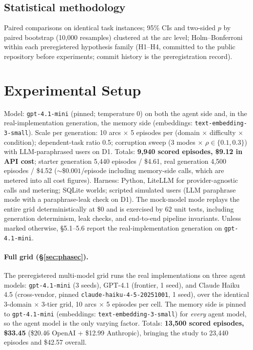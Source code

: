 \documentclass[11pt]{article}
\begin{document}
\subsection{Statistical methodology}

Paired comparisons on identical task instances; 95\% CIs and two-sided $p$ by
paired bootstrap (10{,}000 resamples) clustered at the arc level;
Holm--Bonferroni within each preregistered hypothesis family (H1--H4,
committed to the public repository before experiments; commit history is the
preregistration record).

\section{Experimental Setup}

Model: \texttt{gpt-4.1-mini} (pinned; temperature 0) on both the agent side
and, in the real-implementation generation, the memory side (embeddings:
\texttt{text-embedding-3-small}). Scale per generation: 10 arcs $\times$ 5
episodes per (domain $\times$ difficulty $\times$ condition); dependent-task
ratio 0.5; corruption sweep (3 modes $\times$ $\rho \in \{0.1, 0.3\}$) with
LLM-paraphrased users on D1. Totals: \textbf{9{,}940 scored episodes, \$9.12
in API cost}; starter generation 5{,}440 episodes / \$4.61, real
generation 4{,}500 episodes / \$4.52 (${\sim}\$0.001$/episode including
memory-side calls, which are metered into all cost figures). Harness:
Python, LiteLLM for provider-agnostic calls and metering; SQLite worlds;
scripted simulated users (LLM paraphrase mode with a paraphrase-leak check
on D1). The mock-model mode replays the entire grid deterministically at \$0
and is exercised by 62 unit tests, including generation determinism, leak
checks, and end-to-end pipeline invariants. Unless marked otherwise,
\S5.1--5.6 report the real-implementation generation on
\texttt{gpt-4.1-mini}.

\paragraph{Full grid (\S\ref{sec:phasec}).} The preregistered multi-model
grid runs the real implementations on three agent models:
\texttt{gpt-4.1-mini} (3 seeds), GPT-4.1 (frontier, 1 seed), and Claude
Haiku 4.5 (cross-vendor, pinned \texttt{claude-haiku-4-5-20251001}, 1
seed), over the identical 3-domain $\times$ 3-tier grid, 10 arcs
$\times$ 5 episodes per cell. The memory side is pinned to
\texttt{gpt-4.1-mini} (embeddings: \texttt{text-embedding-3-small}) for
\emph{every} agent model, so the agent model is the only varying factor.
Totals: \textbf{13{,}500 scored episodes, \$33.45} (\$20.46 OpenAI +
\$12.99 Anthropic), bringing the study to 23{,}440 episodes and \$42.57
overall.
\end{document}
